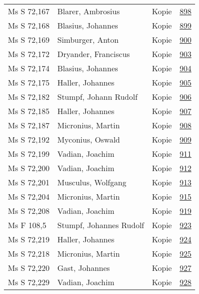 \documentclass[10pt,a4paper,landscape]{report}
\begin{document}
\begin{longtable}{p{16cm}p{4cm}lr}
Ms S 72,167	&	Blarer, Ambrosius	&	Kopie	&	\href{http://130.60.24.72/assignment/898}{898}\\
Ms S 72,168	&	Blasius, Johannes	&	Kopie	&	\href{http://130.60.24.72/assignment/899}{899}\\
Ms S 72,169	&	Simburger, Anton	&	Kopie	&	\href{http://130.60.24.72/assignment/900}{900}\\
Ms S 72,172	&	Dryander, Franciscus	&	Kopie	&	\href{http://130.60.24.72/assignment/903}{903}\\
Ms S 72,174	&	Blasius, Johannes	&	Kopie	&	\href{http://130.60.24.72/assignment/904}{904}\\
Ms S 72,175	&	Haller, Johannes	&	Kopie	&	\href{http://130.60.24.72/assignment/905}{905}\\
Ms S 72,182	&	Stumpf, Johann Rudolf	&	Kopie	&	\href{http://130.60.24.72/assignment/906}{906}\\
Ms S 72,185	&	Haller, Johannes	&	Kopie	&	\href{http://130.60.24.72/assignment/907}{907}\\
Ms S 72,187	&	Micronius, Martin	&	Kopie	&	\href{http://130.60.24.72/assignment/908}{908}\\
Ms S 72,192	&	Myconius, Oswald	&	Kopie	&	\href{http://130.60.24.72/assignment/909}{909}\\
Ms S 72,199	&	Vadian, Joachim	&	Kopie	&	\href{http://130.60.24.72/assignment/911}{911}\\
Ms S 72,200	&	Vadian, Joachim	&	Kopie	&	\href{http://130.60.24.72/assignment/912}{912}\\
Ms S 72,201	&	Musculus, Wolfgang	&	Kopie	&	\href{http://130.60.24.72/assignment/913}{913}\\
Ms S 72,204	&	Micronius, Martin	&	Kopie	&	\href{http://130.60.24.72/assignment/915}{915}\\
Ms S 72,208	&	Vadian, Joachim	&	Kopie	&	\href{http://130.60.24.72/assignment/919}{919}\\
Ms F 108,5	&	Stumpf, Johannes Rudolf	&	Kopie	&	\href{http://130.60.24.72/assignment/923}{923}\\
Ms S 72,219	&	Haller, Johannes	&	Kopie	&	\href{http://130.60.24.72/assignment/924}{924}\\
Ms S 72,218	&	Micronius, Martin	&	Kopie	&	\href{http://130.60.24.72/assignment/925}{925}\\
Ms S 72,220	&	Gast, Johannes	&	Kopie	&	\href{http://130.60.24.72/assignment/927}{927}\\
Ms S 72,229	&	Vadian, Joachim	&	Kopie	&	\href{http://130.60.24.72/assignment/928}{928}\\

\end{longtable}
\end{document}
